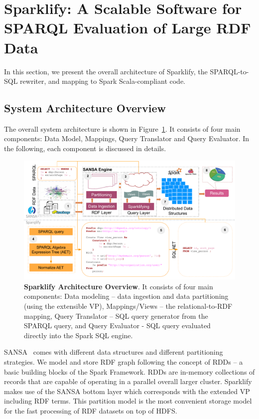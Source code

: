\section{Sparklify: A Scalable Software for SPARQL Evaluation of Large RDF Data}
\label{sec:sparklify-approach}
In this section, we present the overall architecture of Sparklify, the SPARQL-to-SQL rewriter, and mapping to Spark Scala-compliant code.

\subsection{System Architecture Overview}
\label{sec:sparklify-architecture}
The overall system architecture is shown in Figure~\ref{fig:sparklify-architecture}.
It consists of four main components: Data Model, Mappings, Query Translator and Query Evaluator.
In the following, each component is discussed in details.

\begin{figure}
\centering
\includegraphics[width=1.0\textwidth]{images/6_scalable_rdf_querying/sparklify-architecture.pdf}
\caption{\textbf{Sparklify Architecture Overview}.
It consists of four main components: Data modeling -- data ingestion and data partitioning (using the extensible \gls{VP}), Mappings/Views -- the relational-to-RDF mapping, Query Translator -- SQL query generator from the SPARQL query, and Query Evaluator - SQL query evaluated directly into the Spark SQL engine.
}
\label{fig:sparklify-architecture}
\end{figure}

SANSA~\cite{lehmann-2017-sansa-iswc} comes with different data structures and different partitioning strategies.
We model and store \gls{RDF} graph following the concept of \gls{RDD}s -- a basic building blocks of the Spark Framework.
\gls{RDD}s are in-memory collections of records that are capable of operating in a parallel overall larger cluster.
Sparklify makes use of the SANSA bottom layer which corresponds with the extended \gls{VP} including \gls{RDF} terms.
This partition model is the most convenient storage model for the fast processing of \gls{RDF} datasets on top of \gls{HDFS}.
